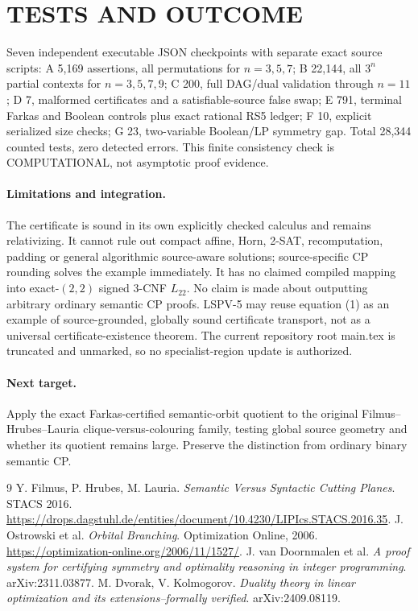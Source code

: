 \documentclass[11pt]{article}
\begin{document}
\section{TESTS AND OUTCOME}
Seven independent executable JSON checkpoints with separate exact source scripts: A 5,169 assertions, all permutations for $n=3,5,7$; B 22,144, all $3^n$ partial contexts for $n=3,5,7,9$; C 200, full DAG/dual validation through $n=11$; D 7, malformed certificates and a satisfiable-source false swap; E 791, terminal Farkas and Boolean controls plus exact rational RS5 ledger; F 10, explicit serialized size checks; G 23, two-variable Boolean/LP symmetry gap. Total 28,344 counted tests, zero detected errors. This finite consistency check is COMPUTATIONAL, not asymptotic proof evidence.

\paragraph{Limitations and integration.}
The certificate is sound in its own explicitly checked calculus and remains relativizing. It cannot rule out compact affine, Horn, 2-SAT, recomputation, padding or general algorithmic source-aware solutions; source-specific CP rounding solves the example immediately. It has no claimed compiled mapping into exact-$(2,2)$ signed 3-CNF $L_{22}$. No claim is made about outputting arbitrary ordinary semantic CP proofs. LSPV-5 may reuse equation (1) as an example of source-grounded, globally sound certificate transport, not as a universal certificate-existence theorem. The current repository root main.tex is truncated and unmarked, so no specialist-region update is authorized.

\paragraph{Next target.}
Apply the exact Farkas-certified semantic-orbit quotient to the original Filmus--Hrubes--Lauria clique-versus-colouring family, testing global source geometry and whether its quotient remains large. Preserve the distinction from ordinary binary semantic CP.

\begin{thebibliography}{9}
 Y. Filmus, P. Hrubes, M. Lauria. \emph{Semantic Versus Syntactic Cutting Planes}. STACS 2016. \url{https://drops.dagstuhl.de/entities/document/10.4230/LIPIcs.STACS.2016.35}.
 J. Ostrowski et al. \emph{Orbital Branching}. Optimization Online, 2006. \url{https://optimization-online.org/2006/11/1527/}.
 J. van Doornmalen et al. \emph{A proof system for certifying symmetry and optimality reasoning in integer programming}. arXiv:2311.03877.
 M. Dvorak, V. Kolmogorov. \emph{Duality theory in linear optimization and its extensions--formally verified}. arXiv:2409.08119.
\end{thebibliography}
\end{document}
